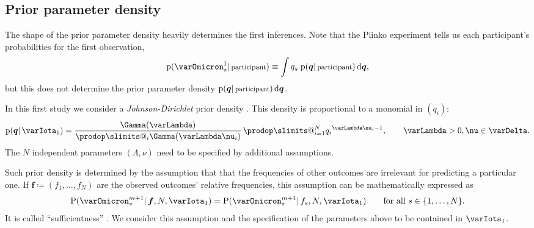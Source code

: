 \documentclass[\ifafour a4paper,12pt,\else a5paper,10pt,\fi%
onecolumn,oneside,article,%
british%
]{memoir}
\makeatletter
\theoremstyle{remark}
\theoremstyle{innote}
\def\sum{\DOTSI\sumop\slimits@}
\def\prod{\DOTSI\prodop\slimits@}
\let\parentext=\parentexttrack%
\newcommand*{\citep}{\parencites}
\newcommand*{\citey}{\parencites*}
\renewcommand*{\cites}{\parencites}
\newcommand*{\di}{\mathrm{d}}%
\newcommand*{\defd}{\coloneqq}
\DeclarePairedDelimiter\set{\{}{\}}
\newcommand*{\pf}{\mathrm{p}}%
\newcommand*{\p}{\mathrm{P}}%
\renewcommand*{\|}{\mathpunct{|}}
\newcommand*{\chap}{ch.}%
\newcommand*{\tsum}{\mathop{\textstyle\sum}\nolimits}
\newcommand*{\simpl}{\varDelta}
\newcommand*{\yqq}{q}
\newcommand*{\yq}{\bm{\yqq}}
\newcommand*{\yff}{f}
\newcommand*{\yf}{\bm{\yff}}
\newcommand*{\yI}{\varIota}
\newcommand*{\yO}{\varOmicron}
\newcommand*{\yMJ}{\yI_1}
\newcommand*{\yN}{\varLambda}
\newcommand*{\ynn}{\nu}
\makeatother
\begin{document}
\subsection{Prior parameter density}
\label{sec:initial_prior}

The shape of the prior parameter density heavily determines the first
inferences. Note that the Plinko experiment tells us each participant's
probabilities for the first observation,
\begin{equation}
  \label{eq:initial_predictive}
  \pf(\yO^1_{s} \| \text{\footnotesize participant}) \equiv \int \yqq_{s}\;
  \pf(\yq \| \text{\footnotesize participant})\,\di\yq,
\end{equation}
but this does not determine the prior parameter density
$\pf(\yq \| \text{\footnotesize participant})\,\di\yq$.

In this first study we consider a \emph{Johnson-Dirichlet} prior density
\parentext{references below}. This density is proportional to a monomial
in $(\yqq_i)$:
\begin{equation}
  \label{eq:JD_prior}
  \pf(\yq \| \yMJ) =
  \frac{\Gamma(\yN)}{\prod_i \Gamma(\yN\ynn_i)}\,
  \prod_{i=1}^N{\yqq_i}^{\yN\ynn_i-1}, \qquad \yN>0, \ynn \in \simpl.
\end{equation}
The $N$ independent parameters $(\yN, \ynn)$ need to be specified by
additional assumptions.

Such prior density is determined by the assumption that that the
frequencies of other outcomes are irrelevant for predicting a particular
one. If $\yf \defd (\yff_{1},\dotsc,\yff_{N})$ are the observed
outcomes' relative frequencies, this assumption can be mathematically
expressed as
\begin{equation}
  \label{eq:sufficientness}
  \p(\yO^{m+1}_s \| \yf, N, \yMJ) =
  \p(\yO^{m+1}_{s} \| \yff_{s}, N, \yMJ)
  \qquad\text{for all } s\in\set{1,\dotsc, N}.
\end{equation}
It is called \enquote{sufficientness}
\cites{johnson1924,johnson1932c}[\chap~4]{good1965}{zabell1982,jaynes1986d_r1996}.
We consider this assumption and the specification of the parameters above
to be contained in $\yMJ$.
\end{document}
